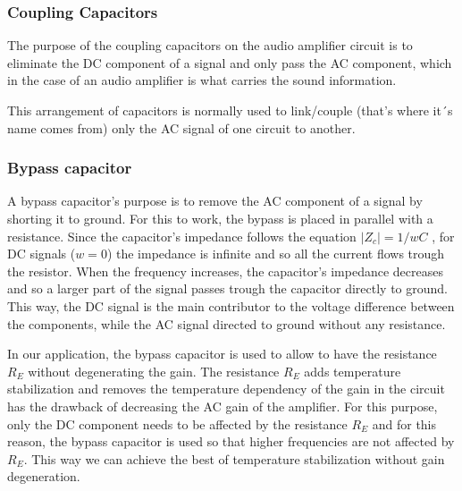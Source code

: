 \subsubsection{Coupling Capacitors}

The purpose of the coupling capacitors on the audio amplifier circuit is to eliminate the DC component of a signal and only pass the AC component, which in the case of an audio amplifier is what carries the sound information.

This arrangement of capacitors is normally used to link/couple (that’s where it´s name comes from) only the AC signal of one circuit to another.

\subsubsection{Bypass capacitor}

A bypass capacitor’s purpose is to remove the AC component of a signal by shorting it to ground.
For this to work, the bypass is placed in parallel with a resistance. Since the capacitor’s impedance follows the equation $|Z_c|=1/wC$ , for DC signals ($w=0$) the impedance is infinite and so all the current flows trough the resistor. When the frequency increases, the capacitor’s impedance decreases and so a larger part of the signal passes trough the capacitor directly to ground. This way, the DC signal is the main contributor to the voltage difference between the components, while the AC signal directed to ground without any resistance.

In our application, the bypass capacitor is used to allow to have the resistance $R_E$ without degenerating the gain. The resistance $R_E$ adds temperature stabilization and removes the temperature dependency of the gain in the circuit has the drawback of decreasing the AC gain of the amplifier. For this purpose, only the DC component needs to be affected by the resistance $R_E$ and for this reason, the bypass capacitor is used so that higher frequencies are not affected by $R_E$. This way we can achieve the best of temperature stabilization without gain degeneration.

